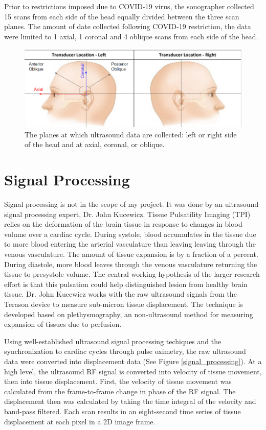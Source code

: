 \documentclass [11pt, proquest] {uwthesis}[2020/02/24]
\begin{document}
Prior to restrictions imposed due to COVID-19 virus, the sonographer collected 15 scans from each side of the head equally divided between
the three scan planes. The amount of date collected following COVID-19 restriction, the data were limited to 1 axial, 1 coronal and 4 oblique
scans from each side of the head.

\begin{figure}
  \centering
  \includegraphics[width=1\linewidth]{figures/ultrasound_angle.png}
  \caption{The planes at which ultrasound data are collected: left or right side of the head and at axial, coronal, or oblique.}
  \label{ultrasound_angle}
\end{figure}

\section{Signal Processing}

Signal processing is not in the scope of my project. It was done by an ultrasound signal processing expert, Dr. John Kucewicz.
Tissue Pulsatility Imaging (TPI) relies on the deformation of the brain tissue in response to changes in 
blood volume over a cardiac cycle. During systole, blood accumulates in the tissue due to more blood entering the arterial 
vasculature than leaving leaving through the venous vasculature. The amount of tissue expansion is by a fraction of a percent.
During diastole, more blood leaves through the venous vasculature returning the tissue to presystole volume\cite{hemodynamics, pulsatile_echo}.
The central working hypothesis of the larger research effort is that this pulsation could help distinguished lesion from
healthy brain tissue. Dr. John Kucewicz works with the raw ultrasound signals from the Terason device to measure sub-micron
tissue displacement. The technique is developed based on plethysmography, an non-ultrasound method for measuring expansion of tissues
due to perfusion\cite{kucewicz_tissue_2008}.

Using well-established ultrasound signal processing techiques and the synchronization to cardiac cycles through pulse oximetry,
the raw ultrasound data were converted into displacement data (See Figure \ref{signal_processing}). At a high level, the ultrasound RF signal 
is converted into velocity of tissue movement, then into tissue displacement. First, the velocity of tissue movement was calculated from the 
frame-to-frame change in phase of the RF signal. The displacement then was calculated by taking the time integral of the velocity and 
band-pass filtered. Each scan results in an eight-second time series of tissue displacement at each pixel in a 2D image frame.
\end{document}
